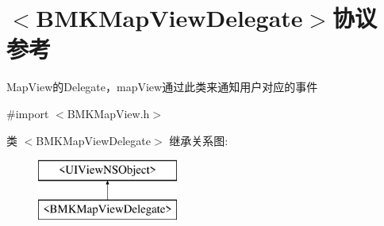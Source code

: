 \hypertarget{protocol_b_m_k_map_view_delegate-p}{}\section{$<$B\+M\+K\+Map\+View\+Delegate$>$协议 参考}
\label{protocol_b_m_k_map_view_delegate-p}


Map\+View的\+Delegate，map\+View通过此类来通知用户对应的事件  




{\ttfamily \#import $<$B\+M\+K\+Map\+View.\+h$>$}

类 $<$B\+M\+K\+Map\+View\+Delegate$>$ 继承关系图\+:\begin{figure}[H]
\begin{center}
\leavevmode
\includegraphics[height=2.000000cm]{protocol_b_m_k_map_view_delegate-p}
\end{center}
\end{figure}
